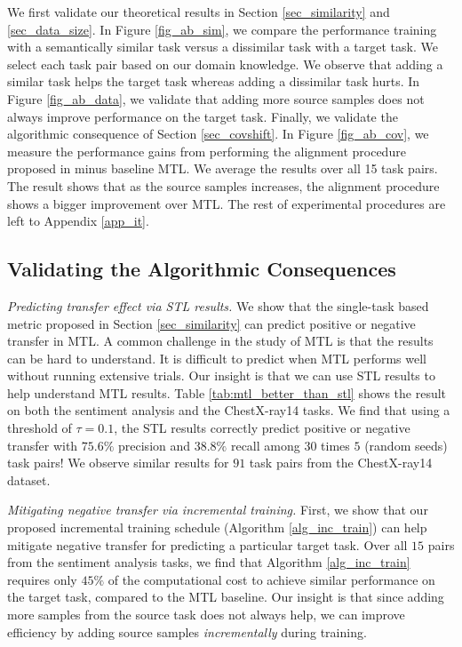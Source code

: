 We first validate our theoretical results in Section \ref{sec_similarity} and \ref{sec_data_size}.
In Figure \ref{fig_ab_sim}, we compare the performance training with a semantically similar task versus a dissimilar task with a target task.
We select each task pair based on our domain knowledge.
We observe that adding a similar task helps the target task whereas adding a dissimilar task hurts.
In Figure \ref{fig_ab_data}, we validate that adding more source samples does not always improve performance on the target task.
Finally, we validate the algorithmic consequence of Section \ref{sec_covshift}.
In Figure \ref{fig_ab_cov}, we measure the performance gains from performing the alignment procedure proposed in \cite{WZR20} minus baseline MTL.
We average the results over all 15 task pairs.
The result shows that as the source samples increases, the alignment procedure shows a bigger improvement over MTL.
The rest of experimental procedures are left to Appendix \ref{app_it}.



\subsection{Validating the Algorithmic Consequences}\label{sec_exp_res}

\textit{Predicting transfer effect via STL results.}
We show that the single-task based metric proposed in Section \ref{sec_similarity} can predict positive or negative transfer in MTL.
A common challenge in the study of MTL is that the results can be hard to understand.
It is difficult to predict when MTL performs well without running extensive trials.
Our insight is that we can use STL results to help understand MTL results.
Table \ref{tab:mtl_better_than_stl} shows the result on both the sentiment analysis and the ChestX-ray14 tasks.
We find that using a threshold of $\tau = 0.1$, the STL results correctly predict positive or negative transfer with $75.6\%$ precision and $38.8\%$ recall among $30$ times $5$ (random seeds) task pairs!
We observe similar results for $91$ task pairs from the ChestX-ray14 dataset.

\textit{Mitigating negative transfer via incremental training.}
First, we show that our proposed incremental training schedule (Algorithm \ref{alg_inc_train}) can help mitigate negative transfer for predicting a particular target task.
Over all $15$ pairs from the sentiment analysis tasks, we find that Algorithm \ref{alg_inc_train} requires only $45\%$ of the computational cost to achieve similar performance on the target task, compared to the MTL baseline.
Our insight is that since adding more samples from the source task does not always help, we can improve efficiency by adding source samples \textit{incrementally} during training.

